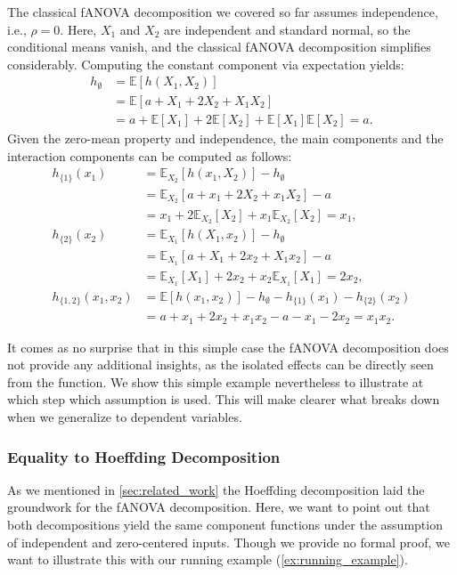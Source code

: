 The classical fANOVA decomposition we covered so far assumes independence, i.e., $\rho = 0$. 
Here, $X_1$ and $X_2$ are independent and standard normal, so the conditional means vanish, and the classical fANOVA decomposition simplifies considerably. 
Computing the constant component via expectation yields:
\begin{align*}
    h_{\emptyset} &= \mathbb{E}[h(X_1, X_2)] \\
    &= \mathbb{E}[a + X_1 + 2X_2 + X_1X_2] \\
    &= a + \mathbb{E}[X_1] + 2\mathbb{E}[X_2] + \mathbb{E}[X_1]\mathbb{E}[X_2] = a.
\end{align*}
Given the zero-mean property and independence, the main components and the interaction components can be computed as follows:
\begin{align*}
h_{\{1\}}(x_1) &= \mathbb{E}_{X_2}[h(x_1, X_2)] - h_{\emptyset} \\
&= \mathbb{E}_{X_2}[a + x_1 + 2X_2 + x_1X_2] - a \\
&= x_1 + 2\mathbb{E}_{X_2}[X_2] + x_1\mathbb{E}_{X_2}[X_2] = x_1,\\
h_{\{2\}}(x_2) &= \mathbb{E}_{X_1}[h(X_1, x_2)] - h_{\emptyset} \\
&= \mathbb{E}_{X_1}[a + X_1 + 2x_2 + X_1x_2] - a \\
&= \mathbb{E}_{X_1}[X_1] + 2x_2 + x_2\mathbb{E}_{X_1}[X_1] = 2x_2,\\
h_{\{1,2\}}(x_1, x_2) &= \mathbb{E}[h(x_1, x_2)] - h_{\emptyset} - h_{\{1\}}(x_1) - h_{\{2\}}(x_2) \\
&= a + x_1 + 2x_2 + x_1x_2 - a - x_1 - 2x_2 = x_1x_2.
\end{align*}

It comes as no surprise that in this simple case the fANOVA decomposition does not provide any additional insights, as the isolated effects can be directly seen from the function.
We show this simple example nevertheless to illustrate at which step which assumption is used.
This will make clearer what breaks down when we generalize to dependent variables.

\subsubsection{Equality to Hoeffding Decomposition}
As we mentioned in \autoref{sec:related_work} the Hoeffding decomposition laid the groundwork for the fANOVA decomposition.
Here, we want to point out that both decompositions yield the same component functions under the assumption of independent and zero-centered inputs. Though we provide no formal proof, we want to illustrate this with our running example (\autoref{ex:running_example}).


